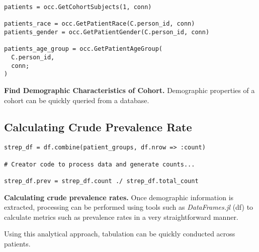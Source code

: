 \documentclass{juliacon}
\begin{document}

\begin{listing}[!ht]
\begin{verbatim}
patients = occ.GetCohortSubjects(1, conn)

patients_race = occ.GetPatientRace(C.person_id, conn)
patients_gender = occ.GetPatientGender(C.person_id, conn)

patients_age_group = occ.GetPatientAgeGroup(
  C.person_id, 
  conn; 
)
\end{verbatim}
\caption{\textbf{Find Demographic Characteristics of Cohort.} Demographic properties of a cohort can be quickly queried from a database.}
\label{listing:demographics}
\end{listing}

\subsection{Calculating Crude Prevalence Rate}


\begin{listing}[!ht]
\begin{verbatim}
strep_df = df.combine(patient_groups, df.nrow => :count)

# Creator code to process data and generate counts...

strep_df.prev = strep_df.count ./ strep_df.total_count 
\end{verbatim}
\caption{\textbf{Calculating crude prevalence rates.} Once demographic information is extracted, processing can be performed using tools such as \textit{DataFrames.jl} (df) to calculate metrics such as prevalence rates in a very straightforward manner.}
\label{listing:prevalence}
\end{listing}

Using this analytical approach, tabulation can be quickly conducted across patients.


\end{document}
